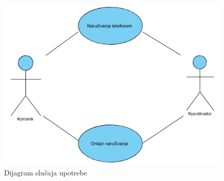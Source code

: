 \begin{figure}[ht]
    \leavevmode
    \begin{center}
    \includegraphics[height=0.5\textheight]{slike/Upravljanje_porudzbinomUC.png}
    \end{center}
    \caption{Dijagram slučaja upotrebe}
\end{figure}


\newpage
